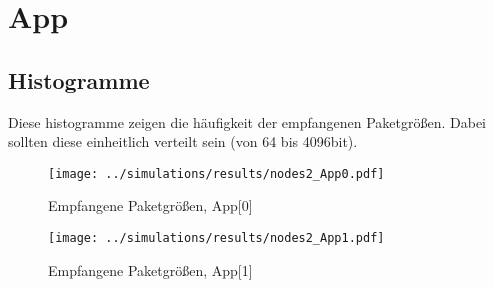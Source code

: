 \documentclass[]{scrartcl}
\begin{document}
\section{App}
\subsection{Histogramme}
Diese histogramme zeigen die häufigkeit der empfangenen Paketgrößen.
Dabei sollten diese einheitlich verteilt sein (von 64 bis 4096bit).
\begin{figure}[ht]
    \texttt{[image: ../simulations/results/nodes2\_App0.pdf]}
    \caption{Empfangene Paketgrößen, App[0]}
\end{figure}
\begin{figure}[ht]
    \texttt{[image: ../simulations/results/nodes2\_App1.pdf]}
    \caption{Empfangene Paketgrößen, App[1]}
\end{figure}
\end{document}

